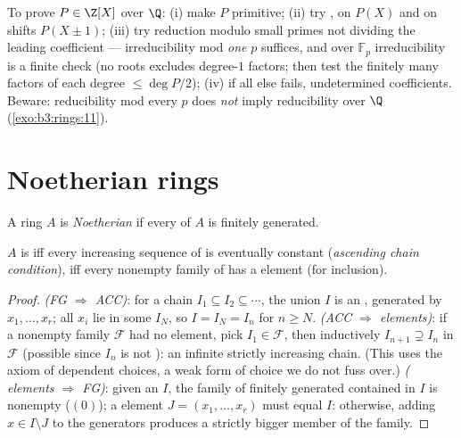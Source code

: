 \begin{method}\label{met:b3:rings:irreducibility}
To prove $P \in \Z[X]$  over $\Q$: (i) make $P$
primitive; (ii) try , on $P(X)$ and on shifts $P(X \pm
1)$; (iii) try reduction modulo small primes not dividing the
leading coefficient --- irreducibility mod \emph{one} $p$
suffices, and over $\mathbb F_p$ irreducibility is a finite check
(no roots excludes degree-$1$ factors; then test the finitely many
factors of each degree $\leq \deg P/2$); (iv) if all else fails,
undetermined coefficients. Beware: reducibility mod every $p$ does
\emph{not} imply reducibility over $\Q$
(\cref{exo:b3:rings:11}).
\end{method}

\section{Noetherian rings}

\begin{definition}\label{def:b3:rings:noetherian}
A ring $A$ is \emph{Noetherian} if every
 of $A$ is finitely generated.
\end{definition}

\begin{proposition}\label{prop:b3:rings:noethacc}
$A$ is  iff every increasing sequence of  is
eventually constant (\emph{ascending chain condition}), iff every
nonempty family of  has a  element (for inclusion).
\end{proposition}

\begin{proof}
\emph{(FG $\Rightarrow$ ACC)}: for a chain $I_1 \subseteq I_2
\subseteq \cdots$, the union $I$ is an , generated by $x_1,
\dots, x_r$; all $x_i$ lie in some $I_N$, so $I = I_N = I_n$ for
$n \geq N$. \emph{(ACC $\Rightarrow$  elements)}: if a
nonempty family $\mathcal F$ had no  element, pick $I_1 \in
\mathcal F$, then inductively $I_{n+1} \supsetneq I_n$ in
$\mathcal F$ (possible since $I_n$ is not ): an infinite
strictly increasing chain. (This uses the axiom of dependent
choices, a weak form of choice we do not fuss over.)
\emph{( elements $\Rightarrow$ FG)}: given an  $I$,
the family of finitely generated  contained in $I$ is
nonempty ($(0)$); a  element $J = (x_1, \dots, x_r)$ must
equal $I$: otherwise, adding $x \in I \setminus J$ to the
generators produces a strictly bigger member of the family.
\end{proof}

